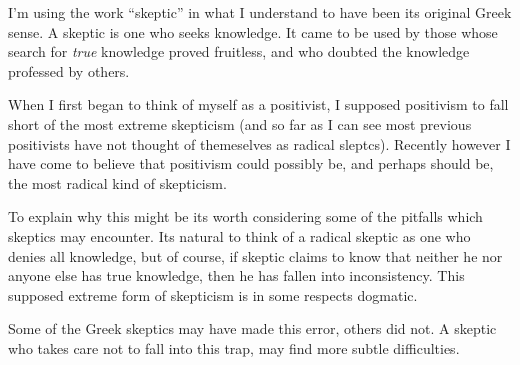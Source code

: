 \documentclass{rbjk}
\begin{document}
\begin{article}
I'm using the work ``skeptic'' in what I understand to have been its original Greek sense.
A skeptic is one who seeks knowledge.
It came to be used by those whose search for {\it true} knowledge proved fruitless, and who doubted the knowledge professed by others.

When I first began to think of myself as a positivist, I supposed positivism to fall short of the most extreme skepticism (and so far as I can see most previous positivists have not thought of themeselves as radical sleptcs).
Recently however I have come to believe that positivism could possibly be, and perhaps should be, the most radical kind of skepticism.

To explain why this might be its worth considering some of the pitfalls which skeptics may encounter.
Its natural to think of a radical skeptic as one who denies all knowledge, but of course, if skeptic claims to know that neither he nor anyone else has true knowledge, then he has fallen into inconsistency.
This supposed extreme form of skepticism is in some respects dogmatic.

Some of the Greek skeptics may have made this error, others did not.
A skeptic who takes care not to fall into this trap, may find more subtle difficulties.







%
%

\end{article}
\end{document}
